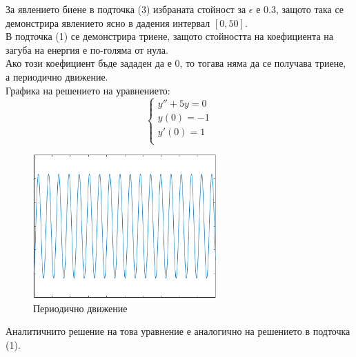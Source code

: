 \documentclass[11pt]{article}
\newcommand{\picturewidth}{7cm}
\begin{document}
\begin{flushleft}
За явлението биене в подточка (3) избраната стойност за $\epsilon$ е $0.3$, защото така се демонстрира явлението
    ясно в дадения интервал $[0, 50]$. \\

\vspace{0.5cm}
В подточка (1) се демонстрира триене, защото стойността на коефициента на загуба на енергия е по-голяма от нула. \\
Ако този коефициент бъде зададен да е 0, то тогава няма да се получава триене, а периодично движение. \\

\vspace{0.2cm}
Графика на решението на уравнението:
$$
\begin{cases}
    y'' + 5y = 0 \\
    y(0) = -1 \\
    y'(0) = 1 \\
\end{cases}
$$

\begin{figure}[H]
    \centering
    \includegraphics[width=\picturewidth]{pictures/periodichno.png}
    \caption{Периодично движение}
    \label{fig:periodic_movement}
\end{figure}

Аналитичнито решение на това уравнение е аналогично на решението в подточка (1).
\end{flushleft}
\end{document}
